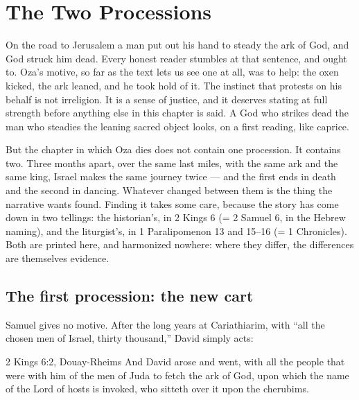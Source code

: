 \sectionguard
\section{The Two Processions}

On the road to Jerusalem a man put out his hand to steady the ark of God, and
God struck him dead. Every honest reader stumbles at that sentence, and ought
to. Oza's motive, so far as the text lets us see one at all, was to help: the
oxen kicked, the ark leaned, and he took hold of it. The instinct that
protests on his behalf is not irreligion. It is a sense of justice, and it
deserves stating at full strength before anything else in this chapter is
said. A God who strikes dead the man who steadies the leaning sacred object
looks, on a first reading, like caprice.

But the chapter in which Oza dies does not contain one procession. It
contains two. Three months apart, over the same last miles, with the same ark
and the same king, Israel makes the same journey twice --- and the first ends
in death and the second in dancing. Whatever changed between them is the
thing the narrative wants found. Finding it takes some care, because the
story has come down in two tellings: the historian's, in 2 Kings 6 (= 2
Samuel 6, in the Hebrew naming), and the liturgist's, in 1 Paralipomenon 13
and 15--16 (= 1 Chronicles). Both are printed here, and harmonized
nowhere: where they differ, the differences are themselves evidence.

\subsection{The first procession: the new cart}

Samuel gives no motive. After the long years at Cariathiarim, with ``all the
chosen men of Israel, thirty thousand,'' David simply acts:

\begin{witnessbox}{2 Kings 6:2, Douay-Rheims}
And David arose and went, with all the people that were with him of the men
of Juda to fetch the ark of God, upon which the name of the Lord of hosts is
invoked, who sitteth over it upon the cherubims.
\end{witnessbox}


